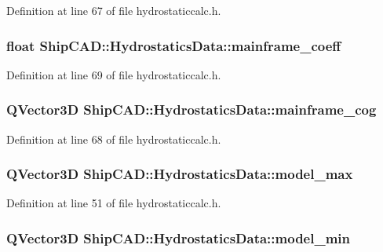 Definition at line 67 of file hydrostaticcalc.\-h.

\hypertarget{structShipCAD_1_1HydrostaticsData_a4208b97fe6110516d71e67708186897a}{
\subsubsection[{mainframe\-\_\-coeff}]{\setlength{\rightskip}{0pt plus 5cm}float Ship\-C\-A\-D\-::\-Hydrostatics\-Data\-::mainframe\-\_\-coeff}}\label{structShipCAD_1_1HydrostaticsData_a4208b97fe6110516d71e67708186897a}


Definition at line 69 of file hydrostaticcalc.\-h.

\hypertarget{structShipCAD_1_1HydrostaticsData_ab726ebe5c185d197a25e4477576266a4}{
\subsubsection[{mainframe\-\_\-cog}]{\setlength{\rightskip}{0pt plus 5cm}Q\-Vector3\-D Ship\-C\-A\-D\-::\-Hydrostatics\-Data\-::mainframe\-\_\-cog}}\label{structShipCAD_1_1HydrostaticsData_ab726ebe5c185d197a25e4477576266a4}


Definition at line 68 of file hydrostaticcalc.\-h.

\hypertarget{structShipCAD_1_1HydrostaticsData_a9319fb2ad054a595b6e3b3fd4059a3ae}{
\subsubsection[{model\-\_\-max}]{\setlength{\rightskip}{0pt plus 5cm}Q\-Vector3\-D Ship\-C\-A\-D\-::\-Hydrostatics\-Data\-::model\-\_\-max}}\label{structShipCAD_1_1HydrostaticsData_a9319fb2ad054a595b6e3b3fd4059a3ae}


Definition at line 51 of file hydrostaticcalc.\-h.

\hypertarget{structShipCAD_1_1HydrostaticsData_acd93669bc08fa097974d41fbaf4dc81f}{
\subsubsection[{model\-\_\-min}]{\setlength{\rightskip}{0pt plus 5cm}Q\-Vector3\-D Ship\-C\-A\-D\-::\-Hydrostatics\-Data\-::model\-\_\-min}}\label{structShipCAD_1_1HydrostaticsData_acd93669bc08fa097974d41fbaf4dc81f}


